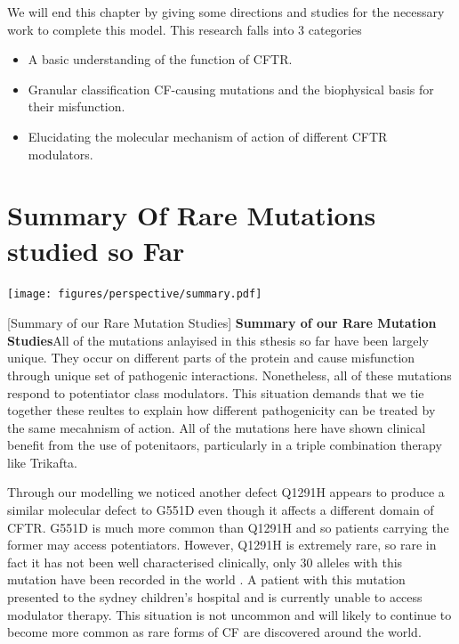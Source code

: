 We will end this chapter by giving some directions and studies for the necessary work to complete this model. This research falls into 3 categories

\begin{itemize}
	\item A basic understanding of the function of CFTR.
	\item Granular classification CF-causing mutations and the biophysical basis for their misfunction.
	\item Elucidating the molecular mechanism of action of different CFTR modulators. 
\end{itemize}

\section{Summary Of Rare Mutations studied so Far}

	\begin{center}
		\texttt{[image: figures/perspective/summary.pdf]}
	\end{center}
\begingroup
\captionsetup{singlelinecheck = false, justification=raggedright}
[Summary of our Rare Mutation Studies] {\textbf{Summary of our Rare Mutation Studies}}{All of the mutations anlayised in this sthesis so far have been largely unique. They occur on different parts of the protein and cause misfunction through unique set of pathogenic interactions. Nonetheless, all of these mutations respond to potentiator class modulators. This situation demands that we tie together these reultes to explain how different pathogenicity can be treated by the same mecahnism of action. All of the mutations here have shown clinical benefit from the use of potenitaors, particularly in a triple combination therapy like Trikafta. } 
\endgroup


Through our modelling we noticed another defect Q1291H appears to produce a similar molecular defect to G551D even though it affects a different domain of CFTR. G551D is much more common than Q1291H and so patients carrying the former may access potentiators. However, Q1291H is extremely rare, so rare in fact it has not been well characterised clinically, only 30 alleles with this mutation have been recorded in the world \cite{cftr2}. A patient with this mutation presented to the sydney children's hospital and is currently unable to access modulator therapy. This situation is not uncommon and will likely to continue to become more common as rare forms of CF are discovered around the world.


